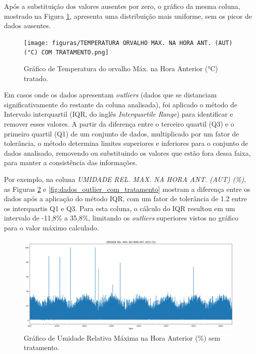 Após a substituição dos valores ausentes por zero, o gráfico da mesma coluna, mostrado na Figura \ref{fig:dados_clima_poa_tratados}, apresenta uma distribuição mais uniforme, sem os picos de dados ausentes.

\begin{figure}[H]
	\caption{\label{fig:dados_clima_poa_tratados}Gráfico de Temperatura do orvalho Máx. na Hora Anterior (°C) tratado.}
	\begin{center}
		\texttt{[image: figuras/TEMPERATURA ORVALHO MAX. NA HORA ANT. (AUT) (°C) COM TRATAMENTO.png]}
	\end{center}
\end{figure}

Em casos onde os dados apresentam \textit{outliers} (dados que se distanciam significativamente do restante da coluna analisada), foi aplicado o método de Intervalo interquartil (\gls{IQR}, do inglês \textit{Interquartile Range}) para identificar e remover esses valores. A partir da diferença entre o terceiro quartil (Q3) e o primeiro quartil (Q1) de um conjunto de dados, multiplicado por um fator de tolerância, o método determina limites superiores e inferiores para o conjunto de dados analisado, removendo ou substituindo os valores que estão fora dessa faixa, para manter a consistência das informações.

Por exemplo, na coluna \textit{UMIDADE REL. MAX. NA HORA ANT. (AUT) (\%)}, as Figuras \ref{fig:dados_outlier_sem_tratamento} e \ref{fig:dados_outlier_com_tratamento} mostram a diferença entre os dados após a aplicação do método \gls{IQR}, com um fator de tolerância de 1.2 entre os interquartis Q1 e Q3. Para esta coluna, o cálculo do IQR resultou em um intervalo de -11,8\% a 35,8\%, limitando os \textit{outliers} superiores vistos no gráfico para o valor máximo calculado. 

\begin{figure}[H]
	\caption{\label{fig:dados_outlier_sem_tratamento}Gráfico de Umidade Relativa Máxima  na Hora Anterior (\%) sem tratamento.}
	\begin{center}
		\includegraphics[scale=0.3]{figuras/UMIDADE REL. MAX. NA HORA ANT. (AUT) SEM TRATAMENTO.png}
	\end{center}
\end{figure}

